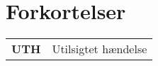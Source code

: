 \section*{Forkortelser}
\begin{table}[H]
\begin{tabular}{p{4.5cm} p{10.5cm}}
\textbf{UTH} 
& Utilsigtet hændelse \vspace{0.5cm} \\
\end{tabular}
\end{table}
